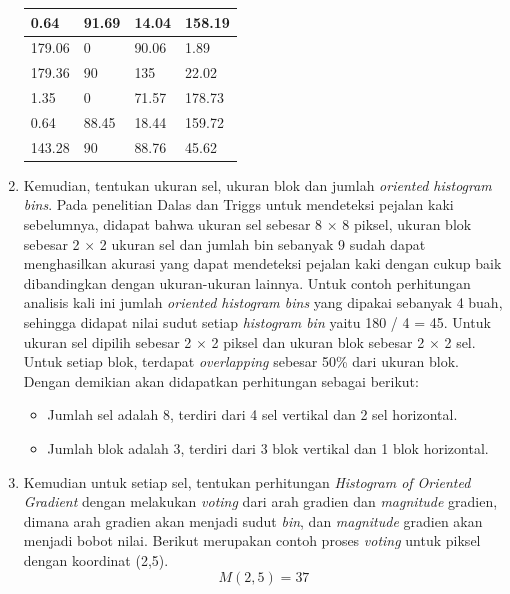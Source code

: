 \begin{enumerate}
\begin{table}[H]
\begin{small}
\begin{tabular}{|p{2cm}|p{2cm}|p{2cm}|p{2cm}|}
			\hline
			0.64 & 91.69 & 14.04 & 158.19 \\
			\hline
			179.06 & 0 & 90.06 & 1.89 \\
			\hline
			179.36 & 90 & 135 & 22.02 \\
			\hline
			1.35 & 0 & 71.57 & 178.73 \\
			\hline
			0.64 & 88.45 & 18.44 & 159.72 \\
			\hline
			143.28 & 90 & 88.76 & 45.62 \\
			\hline
		\end{tabular}
	\end{small}
	\label{fig:MatriksHasilPerhitunganArah}
\end{table}
\item Kemudian, tentukan ukuran sel, ukuran blok dan jumlah \textit{oriented histogram bins}. Pada penelitian Dalas dan Triggs untuk mendeteksi pejalan kaki sebelumnya, didapat bahwa ukuran sel sebesar 8 $\times$ 8 piksel, ukuran blok sebesar 2 $\times$ 2 ukuran sel dan jumlah bin sebanyak 9 sudah dapat menghasilkan akurasi yang dapat mendeteksi pejalan kaki dengan cukup baik dibandingkan dengan ukuran-ukuran lainnya. Untuk contoh perhitungan analisis kali ini jumlah \textit{oriented histogram bins} yang dipakai sebanyak 4 buah, sehingga didapat nilai sudut setiap \textit{histogram bin} yaitu 180 / 4 = 45. Untuk ukuran sel dipilih sebesar 2 $\times$ 2 piksel dan ukuran blok sebesar 2 $\times$ 2 sel. Untuk setiap blok, terdapat \textit{overlapping} sebesar 50\% dari ukuran blok. Dengan demikian akan didapatkan perhitungan sebagai berikut:
\begin{itemize}
\item Jumlah sel adalah 8, terdiri dari 4 sel vertikal dan 2 sel horizontal.
\item Jumlah blok adalah 3, terdiri dari 3 blok vertikal dan 1 blok horizontal.
\end{itemize}
\item Kemudian untuk setiap sel, tentukan perhitungan \textit{Histogram of Oriented Gradient} dengan melakukan \textit{voting} dari arah gradien dan \textit{magnitude} gradien, dimana arah gradien akan menjadi sudut \textit{bin}, dan \textit{magnitude} gradien akan menjadi bobot nilai. Berikut merupakan contoh proses \textit{voting} untuk piksel dengan koordinat (2,5).
\begin{equation*}
M(2,5) = 37
\end{equation*}
\begin{equation*}

\end{equation*}
\end{enumerate}
